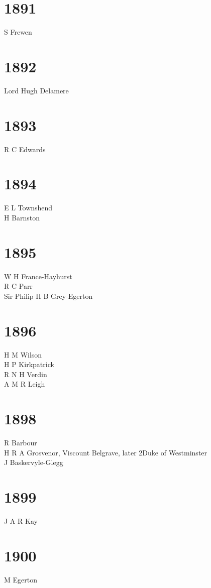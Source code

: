 \begin{multicols}{2}
  \section*{1891}
  S Frewen \\
  \section*{1892}
  Lord Hugh Delamere \\
  \section*{1893}
  R C Edwards \\
  \section*{1894}
  E L Townshend \\
  H Barnston \\
  \section*{1895}
  W H France-Hayhurst \\
  R C Parr \\
  Sir Philip H B Grey-Egerton \\
  \section*{1896}
  H M Wilson \\
  H P Kirkpatrick \\
  R N H Verdin \\
  A M R Leigh \\
  \section*{1898}
  R Barbour \\
  H R A Grosvenor, Viscount Belgrave, later 2\nd Duke of Westminster \\
  J Baskervyle-Glegg \\
  \section*{1899}
  J A R Kay \\
  \section*{1900}
  M Egerton \\

\end{multicols}
